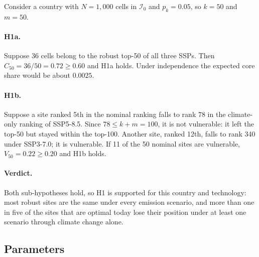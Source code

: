 Consider a country with $N=1{,}000$ cells in $\mathcal{I}_0$ and $p_k=0.05$, so
$k=50$ and $m=50$.

\paragraph{H1a.}
Suppose 36 cells belong to the robust top-50 of all three SSPs. Then
$C_{50}=36/50=0.72\geq0.60$ and H1a holds. Under independence the expected
core share would be about $0.0025$.

\paragraph{H1b.}
Suppose a site ranked 5th in the nominal ranking falls to rank 78 in the
climate-only ranking of SSP5-8.5. Since $78\leq k+m=100$, it is not
vulnerable: it left the top-50 but stayed within the top-100. Another site,
ranked 12th, falls to rank 340 under SSP3-7.0; it is vulnerable. If 11 of the
50 nominal sites are vulnerable, $V_{50}=0.22\geq0.20$ and H1b holds.

\paragraph{Verdict.}
Both sub-hypotheses hold, so H1 is supported for this country and technology:
most robust sites are the same under every emission scenario, and more than
one in five of the sites that are optimal today lose their position under at
least one scenario through climate change alone.

\subsection{Parameters}
\label{subsec:h1_parameters}

